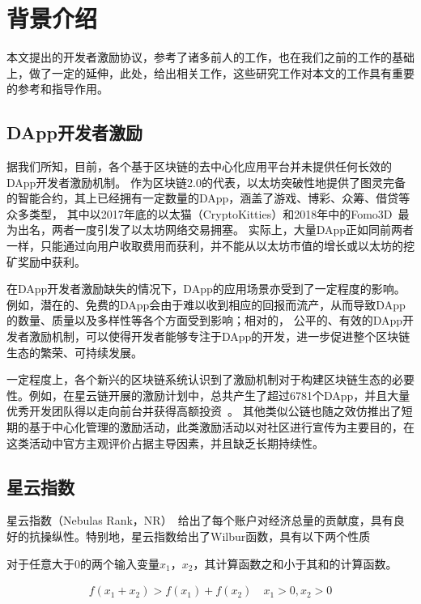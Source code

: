 \section{背景介绍}
\label{sec:back_ground}
本文提出的开发者激励协议，参考了诸多前人的工作，也在我们之前的工作的基础上，做了一定的延伸，此处，给出相关工作，这些研究工作对本文的工作具有重要的参考和指导作用。

\subsection{DApp开发者激励}
据我们所知，目前，各个基于区块链的去中心化应用平台并未提供任何长效的DApp开发者激励机制。
作为区块链2.0的代表，以太坊突破性地提供了图灵完备的智能合约，其上已经拥有一定数量的DApp，涵盖了游戏、博彩、众筹、借贷等众多类型，
其中以2017年底的以太猫（CryptoKitties）和2018年中的Fomo3D~\cite{Fomo3D}最为出名，两者一度引发了以太坊网络交易拥塞。
实际上，大量DApp正如同前两者一样，只能通过向用户收取费用而获利，并不能从以太坊市值的增长或以太坊的挖矿奖励中获利。

在DApp开发者激励缺失的情况下，DApp的应用场景亦受到了一定程度的影响。例如，潜在的、免费的DApp会由于难以收到相应的回报而流产，从而导致DApp的数量、质量以及多样性等各个方面受到影响；相对的，
公平的、有效的DApp开发者激励机制，可以使得开发者能够专注于DApp的开发，进一步促进整个区块链生态的繁荣、可持续发展。

一定程度上，各个新兴的区块链系统认识到了激励机制对于构建区块链生态的必要性。例如，在星云链开展的激励计划中，总共产生了超过6781个DApp，并且大量优秀开发团队得以走向前台并获得高额投资~\cite{Nebulasincentive}。
其他类似公链也随之效仿推出了短期的基于中心化管理的激励活动，此类激励活动以对社区进行宣传为主要目的，在这类活动中官方主观评价占据主导因素，并且缺乏长期持续性。

\subsection{星云指数}
星云指数（Nebulas Rank，NR）~\cite{Nebulasyellowpaper}给出了每个账户对经济总量的贡献度，具有良好的抗操纵性。特别地，星云指数给出了Wilbur函数，具有以下两个性质
\begin{property}
\label{prop:one}
对于任意大于$0$的两个输入变量$x_1$，$x_2$，其计算函数之和小于其和的计算函数。
\end{property}
\begin{align}
f(x_1+x_2)>f(x_1)+f(x_2) \quad x_1>0,x_2>0
\end{align}

